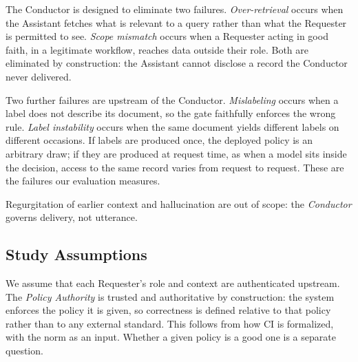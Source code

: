 The Conductor is designed to eliminate two failures. \textit{Over-retrieval}
occurs when the Assistant fetches what is relevant to a query rather than what
the Requester is permitted to see. \textit{Scope mismatch} occurs when a
Requester acting in good faith, in a legitimate workflow, reaches data outside
their role. Both are eliminated by construction: the Assistant cannot disclose
a record the Conductor never delivered.

Two further failures are upstream of the Conductor. \textit{Mislabeling} occurs
when a label does not describe its document, so the gate faithfully enforces
the wrong rule. \textit{Label instability} occurs when the same document yields
different labels on different occasions. If labels are produced once, the
deployed policy is an arbitrary draw; if they are produced at request time, as
when a model sits inside the decision, access to the same record varies from
request to request. These are the failures our evaluation measures.

Regurgitation of earlier context and hallucination are out of scope: the
{\em Conductor} governs delivery, not utterance.

\subsection{Study Assumptions}
We assume that each Requester's role and context are authenticated upstream.
The {\em Policy Authority} is trusted and authoritative by construction: the
system enforces the policy it is given, so correctness is defined relative to
that policy rather than to any external standard. This follows from how CI is
formalized, with the norm as an input. Whether a given
policy is a good one is a separate question.
